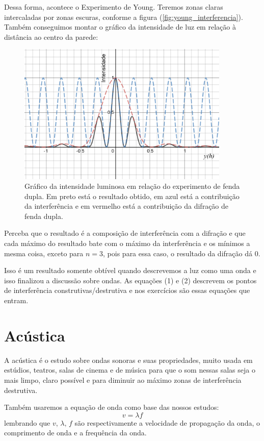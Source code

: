 \documentclass[12pt]{extarticle}
\newcommand{\<}{\langle}
\renewcommand{\>}{\rangle}
\theoremstyle{definition}
\begin{document}
Dessa forma, acontece o Experimento de Young. Teremos zonas claras intercaladas por zonas escuras, conforme a figura (\ref{fig:young_interferencia}). Também conseguimos montar o gráfico da intensidade de luz em relação à distância ao centro da parede:

\begin{figure}[H]
    \centering
    \includegraphics[width=0.9\textwidth]{padrao_inter_difracao.png}
    \caption{Gráfico da intensidade luminosa em relação do experimento de fenda dupla. Em preto está o resultado obtido, em azul está a contribuição da interferência e em vermelho está a contribuição da difração de fenda dupla.}
    \label{fig:resultado}
\end{figure}
Perceba que o resultado é a composição de interferência com a difração e que cada máximo do resultado bate com o máximo da interferência e os mínimos a mesma coisa, exceto para $n=3$, pois para essa caso, o resultado da difração dá 0.

Isso é um resultado somente obtível quando descrevemos a luz como uma onda e isso finalizou a discussão sobre ondas. As equações (1) e (2) descrevem os pontos de interferência construtivas/destrutiva e nos exercícios são essas equações que entram.

\section{Acústica}
A acústica é o estudo sobre ondas sonoras e suas propriedades, muito usada em estúdios, teatros, salas de cinema e de música para que o som nessas salas seja o mais limpo, claro possível e para diminuir ao máximo zonas de interferência destrutiva.

Também usaremos a equação de onda como base das nossos estudos:
\begin{equation}
    v=\lambda f
\end{equation}
\noindent lembrando que $v,\,\lambda,\,f$ são respectivamente a velocidade de propagação da onda, o comprimento de onda e a frequência da onda.
\end{document}
